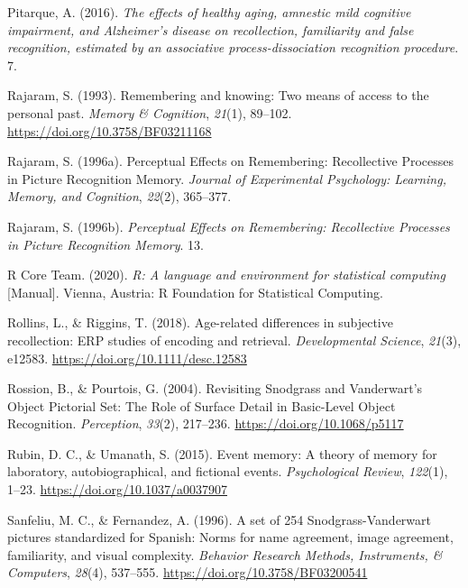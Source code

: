 \documentclass[
  11pt,
]{article}
\begin{document}
\leavevmode\hypertarget{ref-pitarque2016}{}%
Pitarque, A. (2016). \emph{The effects of healthy aging, amnestic mild
cognitive impairment, and Alzheimer's disease on recollection,
familiarity and false recognition, estimated by an associative
process-dissociation recognition procedure}. 7.

\leavevmode\hypertarget{ref-rajaram1993}{}%
Rajaram, S. (1993). Remembering and knowing: Two means of access to the
personal past. \emph{Memory \& Cognition}, \emph{21}(1), 89--102.
\url{https://doi.org/10.3758/BF03211168}

\leavevmode\hypertarget{ref-rajaram1996a}{}%
Rajaram, S. (1996a). Perceptual Effects on Remembering: Recollective
Processes in Picture Recognition Memory. \emph{Journal of Experimental
Psychology: Learning, Memory, and Cognition}, \emph{22}(2), 365--377.

\leavevmode\hypertarget{ref-rajaram1996}{}%
Rajaram, S. (1996b). \emph{Perceptual Effects on Remembering:
Recollective Processes in Picture Recognition Memory}. 13.

\leavevmode\hypertarget{ref-rcoreteam2020}{}%
R Core Team. (2020). \emph{R: A language and environment for statistical
computing} {[}Manual{]}. Vienna, Austria: R Foundation for Statistical
Computing.

\leavevmode\hypertarget{ref-rollins2018}{}%
Rollins, L., \& Riggins, T. (2018). Age-related differences in
subjective recollection: ERP studies of encoding and retrieval.
\emph{Developmental Science}, \emph{21}(3), e12583.
\url{https://doi.org/10.1111/desc.12583}

\leavevmode\hypertarget{ref-rossion2004}{}%
Rossion, B., \& Pourtois, G. (2004). Revisiting Snodgrass and
Vanderwart's Object Pictorial Set: The Role of Surface Detail in
Basic-Level Object Recognition. \emph{Perception}, \emph{33}(2),
217--236. \url{https://doi.org/10.1068/p5117}

\leavevmode\hypertarget{ref-rubin2015}{}%
Rubin, D. C., \& Umanath, S. (2015). Event memory: A theory of memory
for laboratory, autobiographical, and fictional events.
\emph{Psychological Review}, \emph{122}(1), 1--23.
\url{https://doi.org/10.1037/a0037907}

\leavevmode\hypertarget{ref-sanfeliu1996}{}%
Sanfeliu, M. C., \& Fernandez, A. (1996). A set of 254
Snodgrass-Vanderwart pictures standardized for Spanish: Norms for name
agreement, image agreement, familiarity, and visual complexity.
\emph{Behavior Research Methods, Instruments, \& Computers},
\emph{28}(4), 537--555. \url{https://doi.org/10.3758/BF03200541}
\end{document}
